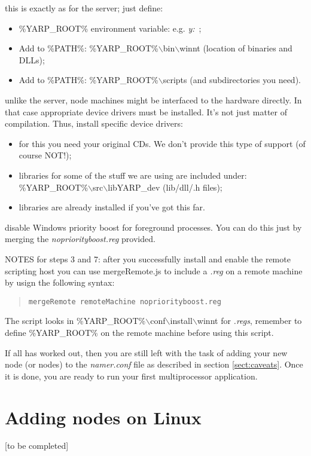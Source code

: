  this is exactly as for the server; just define:
\begin{itemize}
\item \%YARP\_ROOT\% environment variable: e.g. {\em y:}~;
\item Add to \%PATH\%: \%YARP\_ROOT\%$\backslash$bin$\backslash$winnt (location of binaries and DLLs);
\item Add to \%PATH\%: \%YARP\_ROOT\%$\backslash$scripts (and subdirectories you need).
\end{itemize}

 unlike the server, node machines might be interfaced to the hardware directly. In that case appropriate device drivers must be installed. It's not just matter of compilation.
Thus, install specific device drivers:
\begin{itemize}
\item for this you need your original CDs. We don't provide this type of support (of course NOT!);
\item libraries for some of the stuff we are using are included under: \%YARP\_ROOT\%$\backslash$src$\backslash$libYARP\_dev (lib/dll/.h files);
\item libraries are already installed if you've got this far.
\end{itemize}

 disable Windows priority boost for foreground processes. You can do this just by merging the {\em nopriorityboost.reg} provided.

\vspace{1cm}
NOTES for steps 3 and 7: after you successfully install and enable the remote scripting host you can use mergeRemote.js to include a {\em .reg} on a remote machine by usign the following syntax:
\begin{quote}
\tt{mergeRemote remoteMachine nopriorityboost.reg}
\end{quote}

The script looks in \%YARP\_ROOT\%$\backslash$conf$\backslash$install$\backslash$winnt for {\em .regs}, remember to define
\%YARP\_ROOT\% on the remote machine before using this script.

If all has worked out, then you are still left with the task of adding your new node (or nodes) to the {\em namer.conf} file as described in section \ref{sect:caveats}. Once it is done, you are ready to run your first multiprocessor application.


\section{Adding nodes on Linux}
[to be completed]